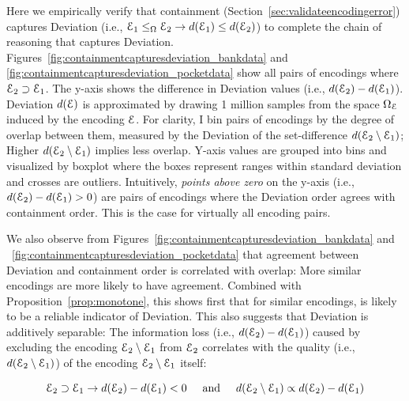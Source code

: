 Here we empirically verify that containment (Section~\ref{sec:validateencodingerror}) captures Deviation (i.e., $\mathcal E_1\leq_{\Omega} \mathcal E_2\to d(\mathcal E_1)\leq d(\mathcal E_2)$) to complete the chain of reasoning that \errorname captures Deviation.
Figures~\ref{fig:containmentcapturesdeviation_bankdata} and \ref{fig:containmentcapturesdeviation_pocketdata} show all pairs of encodings where $\mathcal E_2\supset \mathcal E_1$.
The y-axis shows the difference in Deviation values (i.e., $d(\mathcal E_2)-d(\mathcal E_1)$).
Deviation $d(\mathcal E)$ is approximated by drawing 1 million samples from the space $\Omega_{\mathcal E}$ induced by the encoding $\mathcal E$.
For clarity, I bin pairs of encodings by the degree of overlap between them, measured by the Deviation of the set-difference $d(\mathcal E_2\setminus \mathcal E_1)$; Higher $d(\mathcal E_2\setminus \mathcal E_1)$ implies less overlap. 
Y-axis values are grouped into bins and visualized by boxplot where the boxes represent ranges within standard deviation and crosses are outliers.
Intuitively, \emph{points above zero} on the y-axis (i.e., $d(\mathcal E_2)-d(\mathcal E_1) > 0$) are pairs of encodings where the Deviation order agrees with containment order.
This is the case for virtually all encoding pairs.  

We also observe from Figures~\ref{fig:containmentcapturesdeviation_bankdata} and ~\ref{fig:containmentcapturesdeviation_pocketdata} that agreement between Deviation and containment order is correlated with overlap: More similar encodings are more likely to have agreement.
Combined with Proposition~\ref{prop:monotone}, this shows first that for similar encodings, \errorname is likely to be a reliable indicator of Deviation.
This also suggests that Deviation is additively separable: The information loss (i.e., $d(\mathcal E_2)-d(\mathcal E_1)$) caused by excluding the encoding $\mathcal E_2\setminus \mathcal E_1$ from $\mathcal E_2$ correlates with the quality (i.e., $d(\mathcal E_2\setminus \mathcal E_1)$) of the encoding $\mathcal E_2\setminus \mathcal E_1$ itself:\vspace*{-4mm}

{\small
$$\mathcal E_2\supset \mathcal E_1\to d(\mathcal E_2)-d(\mathcal E_1)<0\hspace{5mm}\text{and}\hspace{5mm}d(\mathcal E_2\setminus \mathcal E_1)\propto d(\mathcal E_2)-d(\mathcal E_1)$$ 
}\vspace*{-5mm}

